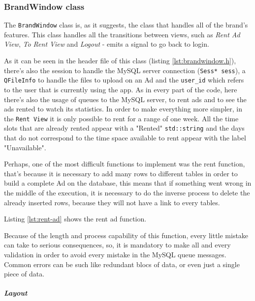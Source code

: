 \subsubsection{BrandWindow class}
%
The \texttt{BrandWindow} class is, as it suggests, the class that handles all of the brand's features.
This class handles all the transitions between views, such as \emph{Rent Ad View}, \emph{To Rent View} and \emph{Logout} - emits a signal to go back to login.
%
%

As it can be seen in the header file of this class (listing \ref{lst:brandwindow.h}), there's also the session to handle the MySQL server connection (\texttt{Sess* sess}), a \texttt{QFileInfo} to handle the files to upload on an Ad and the \texttt{user\_id} which refers to the user that is currently using the app.
As in every part of the code, here there's also the usage of queues to the MySQL server, to rent ads and to see the ads rented to watch its statistics.
In order to make everything more simpler, in the \texttt{Rent View} it is only possible to rent for a range of one week. All the time slots that are already rented appear with a "Rented" \texttt{std::string} and the days that do not correspond to the time space available to rent appear with the label "Unavailable".

Perhaps, one of the most difficult functions to implement was the rent function, that's because it is necessary to add many rows to different tables in order to build a complete Ad on the database, this means that if something went wrong in the middle of the execution, it is necessary to do the inverse process to delete the already inserted rows, because they will not have a link to every tables.

Listing \ref{lst:rent-ad} shows the rent ad function.
%


Because of the length and process capability of this function, every little mistake can take to serious consequences, so, it is mandatory to make all and every validation in order to avoid every mistake in the MySQL queue messages. Common errors can be such like redundant blocs of data, or even just a single piece of data.

\paragraph{\emph{Layout}}

